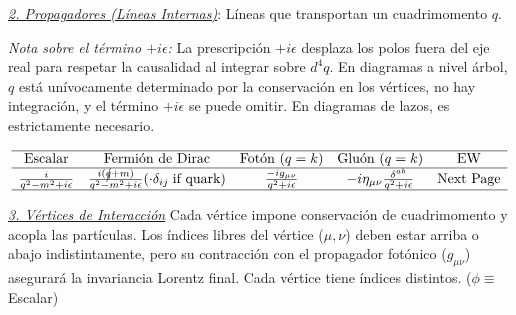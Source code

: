\underline{\textit{2. Propagadores (Líneas Internas)}}: Líneas que transportan un cuadrimomento $q$. 

\textit{Nota sobre el término $+i\epsilon$:} La prescripción $+i\epsilon$ desplaza los polos fuera del eje real para respetar la causalidad al integrar sobre $d^4q$. En diagramas a nivel árbol, $q$ está unívocamente determinado por la conservación en los vértices, no hay integración, y el término $+i\epsilon$ se puede omitir. En diagramas de lazos, es estrictamente necesario.
\vspace{-0.5mm}
{
$$\begin{array}{ccccc}
\hline
\text{Escalar} & \text{Fermión de Dirac} & \text{Fotón } (q=k) & \text{Gluón } (q=k) & \text{EW}\\
\hline
\frac{i}{q^2 - m^2 + i\epsilon} & \frac{i(\cancel{q} + m)}{q^2 - m^2 + i\epsilon} (\cdot \delta_{ij} \; \text{if quark}) & \frac{-ig_{\mu\nu}}{q^2 + i\epsilon} & -i \eta_{\mu \nu} \frac{\delta^{ab}}{q^2+i\epsilon}& \text{Next Page}\\
\hline
\end{array}$$

}
\vspace{2pt}
\underline{\textit{3. Vértices de Interacción}}
Cada vértice impone conservación de cuadrimomento y acopla las partículas. Los índices libres del vértice ($\mu, \nu$) deben estar arriba o abajo indistintamente, pero su contracción con el propagador fotónico ($g_{\mu\nu}$) asegurará la invariancia Lorentz final. Cada vértice tiene índices distintos. ($\phi\equiv $ Escalar)

